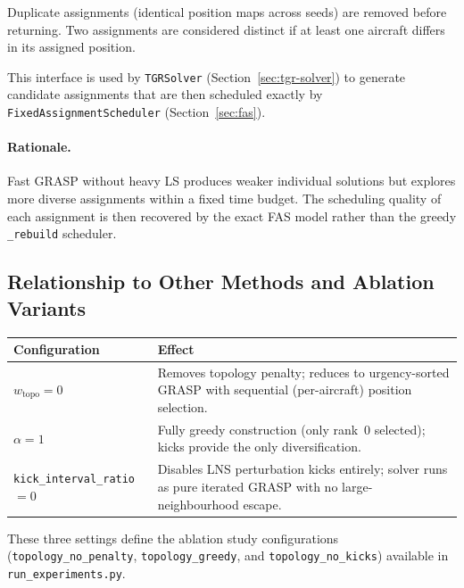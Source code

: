 Duplicate assignments (identical position maps across seeds) are removed before
returning.  Two assignments are considered distinct if at least one aircraft
differs in its assigned position.

This interface is used by \texttt{TGRSolver} (Section~\ref{sec:tgr-solver})
to generate candidate assignments that are then scheduled exactly by
\texttt{FixedAssignmentScheduler} (Section~\ref{sec:fas}).

\paragraph{Rationale.}
Fast GRASP without heavy LS produces weaker individual solutions but explores
more diverse assignments within a fixed time budget.  The scheduling quality
of each assignment is then recovered by the exact FAS model rather than the
greedy \texttt{\_rebuild} scheduler.

\subsection{Relationship to Other Methods and Ablation Variants}

\begin{center}
\begin{tabular}{lp{9cm}}
\toprule
Configuration & Effect \\
\midrule
$w_{\text{topo}} = 0$ & Removes topology penalty; reduces to urgency-sorted GRASP
    with sequential (per-aircraft) position selection. \\
$\alpha = 1$ & Fully greedy construction (only rank~0 selected);
    kicks provide the only diversification. \\
\texttt{kick\_interval\_ratio} $= 0$ & Disables LNS perturbation kicks entirely;
    solver runs as pure iterated GRASP with no large-neighbourhood escape. \\
\bottomrule
\end{tabular}
\end{center}

These three settings define the ablation study configurations
(\texttt{topology\_no\_penalty}, \texttt{topology\_greedy}, and
\texttt{topology\_no\_kicks}) available in \texttt{run\_experiments.py}.
